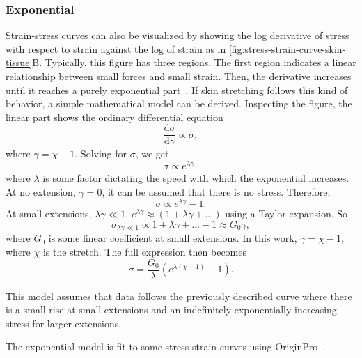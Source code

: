 \subsubsection{Exponential}
Strain-stress curves can also be visualized by showing the log derivative of stress with respect to strain against the log of strain as in \cref{fig:stress-strain-curve-skin-tissue}B.
Typically, this figure has three regions.
The first region indicates a linear relationship between small forces and small strain.
Then, the derivative increases until it reaches a purely exponential part~\cite{Holzapfel2001}.
If skin stretching follows this kind of behavior, a simple mathematical model can be derived.
Inspecting the figure, the linear part shows the ordinary differential equation
\begin{equation}
    \frac{\mathrm{d}\sigma}{\mathrm{d}\gamma} \propto \sigma,
\end{equation}
where $\gamma = \chi - 1$.
Solving for $\sigma$, we get
\begin{equation}
    \sigma \propto e^{\lambda\gamma},
\end{equation}
where $\lambda$ is some factor dictating the speed with which the exponential increases.
At no extension, $\gamma=0$, it can be assumed that there is no stress.
Therefore,
\begin{equation}
    \sigma \propto e^{\lambda\gamma} - 1.
\end{equation}
At small extensions, $\lambda\gamma \ll 1$, $e^{\lambda\gamma} \approx (1 + \lambda\gamma + \ldots)$ using a Taylor expansion.
So
\begin{equation}
    \sigma_{\lambda\gamma\ll 1} \propto 1 + \lambda\gamma + \ldots - 1 \approx G_0 \gamma,
\end{equation}
where $G_0$ is some linear coefficient at small extensions.
In this work, $\gamma = \chi - 1$, where $\chi$ is the stretch.
The full expression then becomes
\begin{equation}\label{eq:exp}
    \sigma = \frac{G_0}{\lambda}\left(e^{\lambda(\chi - 1)}-1\right).
\end{equation}

This model assumes that data follows the previously described curve where there is a small rise at small extensions and an indefinitely exponentially increasing stress for larger extensions.

The exponential model is fit to some stress-strain curves using OriginPro~\cite{OriginPro}.

